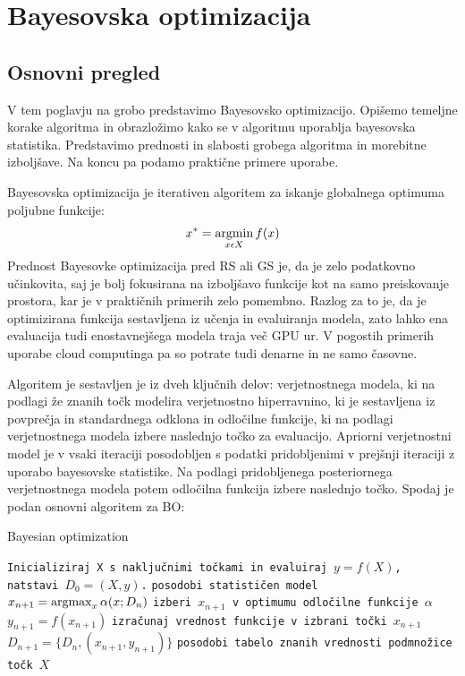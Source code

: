 \documentclass[a4paper, 12pt]{book}
\begin{document}
\chapter{Bayesovska optimizacija}

\section{Osnovni pregled}

\par V tem poglavju na grobo predstavimo Bayesovsko optimizacijo.
Opišemo temeljne korake algoritma in obrazložimo kako se v algoritmu uporablja bayesovska statistika.
Predstavimo prednosti in slabosti grobega algoritma in morebitne izboljšave.
Na koncu pa podamo praktične primere uporabe.
\par Bayesovska optimizacija je iterativen algoritem za iskanje globalnega optimuma poljubne funkcije: 
\begin{equation}
	x^* = \operatornamewithlimits{argmin}_{x \epsilon X} f(x)
\end{equation}
Prednost Bayesovke optimizacija pred RS ali GS je, da je zelo podatkovno učinkovita, saj je bolj fokusirana na izboljšavo funkcije kot na samo preiskovanje prostora, kar je v praktičnih primerih zelo pomembno.
Razlog za to je, da je optimizirana funkcija sestavljena iz učenja in evaluiranja modela, zato lahko ena evaluacija tudi enostavnejšega modela traja več GPU ur.
V pogostih primerih uporabe cloud computinga pa so potrate tudi denarne in ne samo časovne.
\par Algoritem je sestavljen je iz dveh ključnih delov: 
verjetnostnega modela, ki na podlagi že znanih točk modelira verjetnostno hiperravnino, ki je sestavljena iz povprečja in standardnega odklona in
 odločilne funkcije, ki na podlagi verjetnostnega modela izbere naslednjo točko za evaluacijo. 
Apriorni verjetnostni model je v vsaki iteraciji posodobljen s podatki pridobljenimi v prejšnji iteraciji z uporabo bayesovske statistike.
Na podlagi pridobljenega posteriornega verjetnostnega modela potem odločilna funkcija izbere naslednjo točko.
Spodaj je podan osnovni algoritem za BO:

\begin{algorithm}[H]
	\caption{Bayesian optimization}\label{basic:bayesianOpt}
  	\begin{algorithmic}[1]
  		 \State \texttt{Inicializiraj X s naključnimi točkami in evaluiraj $y= f(X)$, natstavi $D_0 = (X, y)$.}
			\State \texttt{posodobi statističen model}
			\State \texttt{$x_{n+1} = \operatornamewithlimits{argmax}_{x} \alpha(x; D_n)$}	\Comment \texttt{izberi $x_{n+1}$ v optimumu odločilne funkcije $\alpha$}
			\State \texttt{$y_{n+1} = f(x_{n+1})$}	\Comment \texttt{izračunaj vrednost funkcije v izbrani točki $x_{n+1}$}
			\State \texttt{$D_{n+1}=\{D_{n}, (x_{n+1}, y_{n+1})\}$} \Comment \texttt{posodobi tabelo znanih vrednosti podmnožice točk $X$}
		\EndFor
 	\end{algorithmic}
\end{algorithm}
\end{document}
